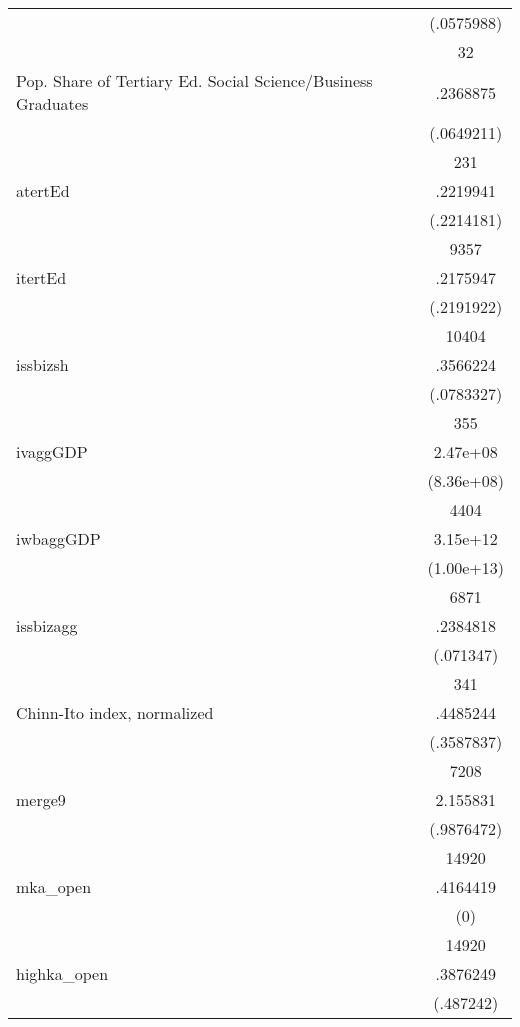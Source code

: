 {\begin{longtable}{l*{1}{c}}
                    &  (.0575988)\\
                    &          32\\
Pop. Share of Tertiary Ed. Social Science/Business Graduates&    .2368875\\
                    &  (.0649211)\\
                    &         231\\
atertEd             &    .2219941\\
                    &  (.2214181)\\
                    &        9357\\
itertEd             &    .2175947\\
                    &  (.2191922)\\
                    &       10404\\
issbizsh            &    .3566224\\
                    &  (.0783327)\\
                    &         355\\
ivaggGDP            &    2.47e+08\\
                    &  (8.36e+08)\\
                    &        4404\\
iwbaggGDP           &    3.15e+12\\
                    &  (1.00e+13)\\
                    &        6871\\
issbizagg           &    .2384818\\
                    &   (.071347)\\
                    &         341\\
Chinn-Ito index, normalized&    .4485244\\
                    &  (.3587837)\\
                    &        7208\\
merge9              &    2.155831\\
                    &  (.9876472)\\
                    &       14920\\
mka\_open            &    .4164419\\
                    &         (0)\\
                    &       14920\\
highka\_open         &    .3876249\\
                    &   (.487242)\\

\end{longtable}}
